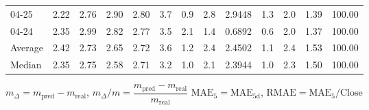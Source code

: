 \begin{threeparttable}
{\begin{tabular}{lrrrrrrrrrrrr}
  04-25 &          2.22 &          2.76 &          2.90 &        2.80 &                 3.7 &                 0.9 &        2.8 &       2.9448 &                 1.3 &              2.0 &            1.39 &                 100.00 \\
  04-24 &          2.35 &          2.99 &          2.82 &        2.77 &                 3.5 &                 2.1 &        1.4 &       0.6892 &                 0.6 &              2.0 &            1.37 &                 100.00 \\
Average &          2.42 &          2.73 &          2.65 &        2.72 &                 3.6 &                 1.2 &        2.4 &       2.4502 &                 1.1 &              2.4 &            1.53 &                 100.00 \\
 Median &          2.35 &          2.75 &          2.58 &        2.71 &                 3.2 &                 1.0 &        2.1 &       2.3944 &                 1.0 &              2.3 &            1.50 &                 100.00 \\
\bottomrule
\end{tabular}
}
\begin{tablenotes}\footnotesize
\item $m_\Delta=m_{\text{pred}}-m_{\text{real}}$,
$m_\Delta/m=\dfrac{m_{\text{pred}}-m_{\text{real}}}{m_{\text{real}}}$
$\mathrm{MAE}_5=\mathrm{MAE}_{5\text{d}}$,
$\mathrm{RMAE}=\mathrm{MAE}_5/\text{Close}$
\end{tablenotes}
\end{threeparttable}
\endgroup

